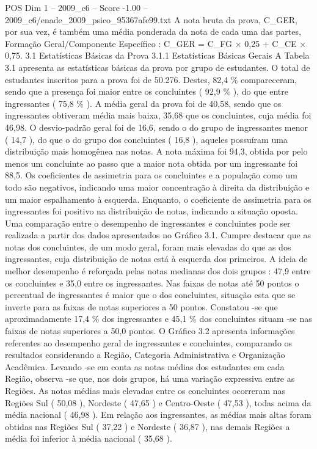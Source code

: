 \begin{textsample}{POS Dim 1 – 2009\_c6 – Score -1.00 – 2009\_c6/enade\_2009\_psico\_95367afe99.txt}
A nota bruta da prova, C\_GER, por sua vez, é também uma média ponderada da nota de cada uma das partes, Formação Geral/Componente Específico : C\_GER = C\_FG × 0,25 + C\_CE × 0,75. 3.1 Estatísticas Básicas da Prova 3.1.1 Estatísticas Básicas Gerais A Tabela 3.1 apresenta as estatísticas básicas da prova por grupo de estudantes.
O total de estudantes inscritos para a prova foi de 50.276.
Destes, 82,4 \% compareceram, sendo que a presença foi maior entre os concluintes ( 92,9 \% ), do que entre ingressantes ( 75,8 \% ).
A média geral da prova foi de 40,58, sendo que os ingressantes obtiveram média mais baixa, 35,68 que os concluintes, cuja média foi 46,98.
O desvio-padrão geral foi de 16,6, sendo o do grupo de ingressantes menor ( 14,7 ), do que o do grupo dos concluintes ( 16,8 ), aqueles possuíram uma distribuição mais homogênea nas notas.
A nota máxima foi 94,3, obtida por pelo menos um concluinte ao passo que a maior nota obtida por um ingressante foi 88,5.
Os coeficientes de assimetria para os concluintes e a população como um todo são negativos, indicando uma maior concentração à direita da distribuição e um maior espalhamento à esquerda.
Enquanto, o coeficiente de assimetria para os ingressantes foi positivo na distribuição de notas, indicando a situação oposta.
Uma comparação entre o desempenho de ingressantes e concluintes pode ser realizada a partir dos dados apresentados no Gráfico 3.1.
Cumpre destacar que as notas dos concluintes, de um modo geral, foram mais elevadas do que as dos ingressantes, cuja distribuição de notas está à esquerda dos primeiros.
A ideia de melhor desempenho é reforçada pelas notas medianas dos dois grupos : 47,9 entre os concluintes e 35,0 entre os ingressantes.
Nas faixas de notas até 50 pontos o percentual de ingressantes é maior que o dos concluintes, situação esta que se inverte para as faixas de notas superiores a 50 pontos.
Constatou -se que aproximadamente 17,4 \% dos ingressantes e 45,1 \% dos concluintes situam -se nas faixas de notas superiores a 50,0 pontos.
O Gráfico 3.2 apresenta informações referentes ao desempenho geral de ingressantes e concluintes, comparando os resultados considerando a Região, Categoria Administrativa e Organização Acadêmica.
Levando -se em conta as notas médias dos estudantes em cada Região, observa -se que, nos dois grupos, há uma variação expressiva entre as Regiões.
As notas médias mais elevadas entre os concluintes ocorreram nas Regiões Sul ( 50,08 ), Nordeste ( 47,65 ) e Centro-Oeste ( 47,53 ), todas acima da média nacional ( 46,98 ).
Em relação aos ingressantes, as médias mais altas foram obtidas nas Regiões Sul ( 37,22 ) e Nordeste ( 36,87 ), nas demais Regiões a média foi inferior à média nacional ( 35,68 ).

\end{textsample}
